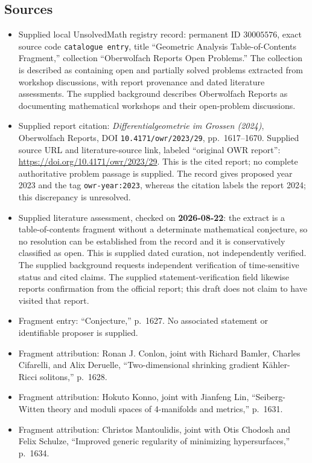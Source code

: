 \documentclass[11pt]{article}
\begin{document}
\subsection{Sources}
\begin{itemize}
\item Supplied local UnsolvedMath registry record: permanent ID \(30005576\), exact source code \texttt{catalogue entry}, title ``Geometric Analysis Table-of-Contents Fragment,'' collection ``Oberwolfach Reports Open Problems.'' The collection is described as containing open and partially solved problems extracted from workshop discussions, with report provenance and dated literature assessments. The supplied background describes Oberwolfach Reports as documenting mathematical workshops and their open-problem discussions.
\item Supplied report citation: \emph{Differentialgeometrie im Grossen (2024)}, Oberwolfach Reports, DOI \texttt{10.4171/owr/2023/29}, pp.\ 1617--1670. Supplied source URL and literature-source link, labeled ``original OWR report'': \url{https://doi.org/10.4171/owr/2023/29}. This is the cited report; no complete authoritative problem passage is supplied. The record gives proposed year 2023 and the tag \texttt{owr-year:2023}, whereas the citation labels the report 2024; this discrepancy is unresolved.
\item Supplied literature assessment, checked on \textbf{2026-08-22}: the extract is a table-of-contents fragment without a determinate mathematical conjecture, so no resolution can be established from the record and it is conservatively classified as open. This is supplied dated curation, not independently verified. The supplied background requests independent verification of time-sensitive status and cited claims. The supplied statement-verification field likewise reports confirmation from the official report; this draft does not claim to have visited that report.
\item Fragment entry: ``Conjecture,'' p.\ 1627. No associated statement or identifiable proposer is supplied.
\item Fragment attribution: Ronan J. Conlon, joint with Richard Bamler, Charles Cifarelli, and Alix Deruelle, ``Two-dimensional shrinking gradient Kähler-Ricci solitons,'' p.\ 1628.
\item Fragment attribution: Hokuto Konno, joint with Jianfeng Lin, ``Seiberg-Witten theory and moduli spaces of 4-manifolds and metrics,'' p.\ 1631.
\item Fragment attribution: Christos Mantoulidis, joint with Otis Chodosh and Felix Schulze, ``Improved generic regularity of minimizing hypersurfaces,'' p.\ 1634.

\end{itemize}
\end{document}
